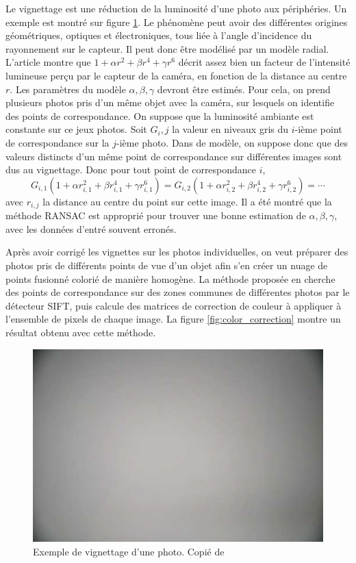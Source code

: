 \documentclass[a4paper,10pt]{scrreprt}
\begin{document}
Le vignettage est une réduction de la luminosité d'une photo aux périphéries. Un exemple est montré sur figure \ref{fig:vignetting}. Le phénomène peut avoir des différentes origines géométriques, optiques et électroniques, tous liée à l'angle d'incidence du rayonnement sur le capteur. Il peut donc être modélisé par un modèle radial. L'article montre que $1 + \alpha r^2 + \beta r^4 + \gamma r^6$ décrit assez bien un facteur de l'intensité lumineuse perçu par le capteur de la caméra, en fonction de la distance au centre $r$. Les paramètres du modèle $\alpha, \beta, \gamma$ devront être estimés. Pour cela, on prend plusieurs photos pris d'un même objet avec la caméra, sur lesquels on identifie des points de correspondance. On suppose que la luminosité ambiante est constante sur ce jeux photos. Soit $G_i,j$ la valeur en niveaux gris du $i$-ième point de correspondance sur la $j$-ième photo. Dans de modèle, on suppose donc que des valeurs distincts d'un même point de correspondance sur différentes images sont dus au vignettage. Donc pour tout point de correspondance $i$,
\begin{equation*}
	G_{i,1} (1 + \alpha r_{i,1}^2 + \beta r_{i,1}^4 + \gamma r_{i,1}^6) = G_{i,2} (1 + \alpha r_{i,2}^2 + \beta r_{i,2}^4 + \gamma r_{i,2}^6) = \cdots
\end{equation*}
avec $r_{i,j}$ la distance au centre du point sur cette image. Il a été montré que la méthode RANSAC est approprié pour trouver une bonne estimation de $\alpha, \beta, \gamma$, avec les données d'entré souvent erronés.

Après avoir corrigé les vignettes sur les photos individuelles, on veut préparer des photos pris de différents points de vue d'un objet afin s'en créer un nuage de points fusionné colorié de manière homogène. La méthode proposée en \cite{Giro2013} cherche des points de correspondance sur des zones communes de différentes photos par le détecteur SIFT, puis calcule des matrices de correction de couleur à appliquer à l'ensemble de pixels de chaque image. La figure \ref{fig:color_correction} montre un résultat obtenu avec cette méthode.

\begin{figure}[p]
\center
\includegraphics[width=.6\textwidth]{vignetting.png}
\caption{Exemple de vignettage d'une photo. Copié de \cite{Giro2013}}
\label{fig:vignetting}
\end{figure}
\end{document}
